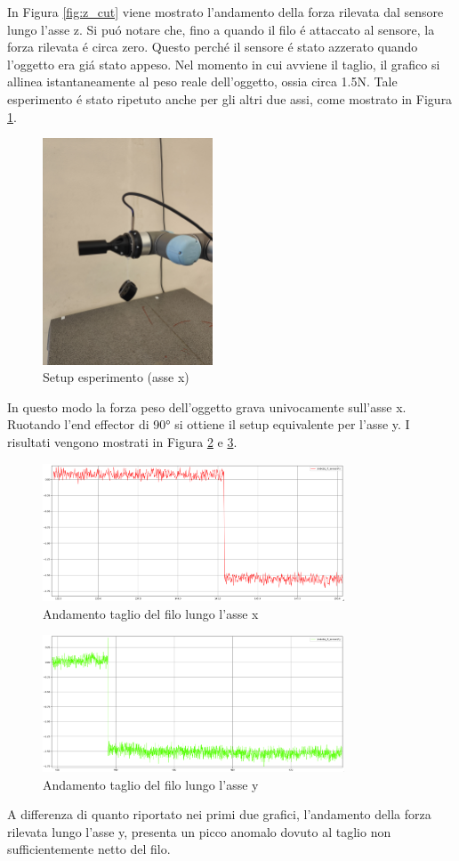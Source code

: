 In Figura \ref{fig:z_cut} viene mostrato l'andamento della forza rilevata dal sensore lungo l'asse z. 
Si pu\'{o} notare che, fino a quando il filo \'{e} attaccato al sensore, la forza rilevata \'{e} circa zero. 
Questo perch\'{e} il sensore \'{e} stato azzerato quando l'oggetto era gi\'{a} stato appeso. 
Nel momento in cui avviene il taglio, il grafico si allinea istantaneamente al peso reale dell'oggetto, 
ossia circa 1.5N.
Tale esperimento \'{e} stato ripetuto anche per gli altri due assi, come mostrato in Figura \ref{fig:setup_x}.
\begin{figure}[H]
    \centering
    \includegraphics*[width=0.45\textwidth]{images/setup_x.jpg}
    \caption{Setup esperimento (asse x)}
    \label{fig:setup_x}
\end{figure}
In questo modo la forza peso dell'oggetto grava univocamente sull'asse x. Ruotando l'end effector di 90° si ottiene il setup 
equivalente per l'asse y.
I risultati vengono mostrati in Figura \ref{fig:x_cut} e \ref{fig:y_cut}. 
\begin{figure}[H]
    \centering
    \includegraphics*[width=0.8\textwidth]{images/x_cut.png}
    \caption{Andamento taglio del filo lungo l'asse x}
    \label{fig:x_cut}
\end{figure}
\begin{figure}[H]
    \centering
    \includegraphics*[width=0.8\textwidth]{images/y_cut.png}
    \caption{Andamento taglio del filo lungo l'asse y}
    \label{fig:y_cut}
\end{figure}
A differenza di quanto riportato nei primi due grafici, l'andamento della forza rilevata lungo l'asse y, presenta un picco 
anomalo dovuto al taglio non sufficientemente netto del filo.

